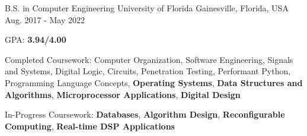 

\begin{cventries}

  \cventry
    {B.S. in Computer Engineering} %
    {University of Florida} %
    {Gainesville, Florida, USA} %
    {Aug. 2017 - May 2022} %
    {
      \begin{cvitems} %
        \item {GPA: \textbf{3.94/4.00}}
        \item {Completed Coursework: Computer Organization, Software Engineering, Signals and Systems, Digital Logic, Circuits, Penetration Testing, Performant Python, Programming Language Concepts, \textbf{Operating Systems}, \textbf{Data Structures and Algorithms}, \textbf{Microprocessor Applications}, \textbf{Digital Design}}
        \item {In-Progress Coursework: \textbf{Databases}, \textbf{Algorithm Design}, \textbf{Reconfigurable Computing}, \textbf{Real-time DSP Applications}}
      \end{cvitems}
    }

\end{cventries}
